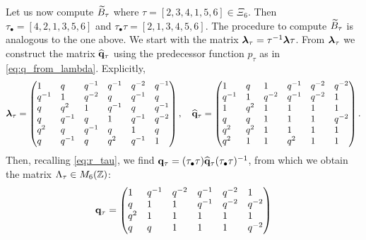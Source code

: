 \begin{example}
	Let us now compute $\widetilde{B}_{\tau}$ where $\tau = [2,3,4,1,5,6] \in \Xi_6$. Then
	$\tau_{\bullet} = [4, 2, 1, 3, 5, 6]$ and $\tau_\bullet\tau = [2, 1, 3, 4, 5, 6]$. The
	procedure to compute $\widetilde{B}_{\tau}$ is analogous to the one above. We start with the
	matrix $\boldsymbol{\lambda}_\tau = \tau^{-1} \boldsymbol{\lambda} \tau$. From $\boldsymbol{\lambda}_\tau$ we construct the matrix
	$\widehat{\mathbf{q}}_\tau$ using the predecessor function $p_\tau$ as in \cref{eq:q_from_lambda}.
	Explicitly,
	\begin{equation}\label{eq:heisenberg_q_hat_tau}
		\bbl_\tau = \begin{pmatrix*}[l]
			1     & q     & q\inv  & q\inv & q^{-2} & q\inv  \\
			q\inv & 1     & q^{-2} & q     & q\inv  & q      \\
			q     & q^{2} & 1      & q\inv & q      & q\inv  \\
			q     & q\inv & q      & 1     & q\inv  & q^{-2} \\
			q^{2} & q     & q\inv  & q     & 1      & q      \\
			q     & q\inv & q      & q^{2} & q\inv  & 1
		\end{pmatrix*}
		, \quad
		\wh{\bbq}_\tau = \begin{pmatrix*}[l]
			1     & q     & 1      & q\inv & q^{-2} & q^{-2} \\
			q\inv & 1     & q^{-2} & q\inv & q^{-2} & 1      \\
			1     & q^{2} & 1      & 1     & 1      & 1      \\
			q     & q     & 1      & 1     & 1      & q^{-2} \\
			q^{2} & q^{2} & 1      & 1     & 1      & 1      \\
			q^{2} & 1     & 1      & q^{2} & 1      & 1
		\end{pmatrix*}.
	\end{equation}
	Then, recalling \cref{eq:r_tau}, we find $\mathbf{q}_\tau = (\tau_\bullet \tau)
		\widehat{\mathbf{q}}_\tau (\tau_\bullet \tau)^{-1}$, from which we obtain the matrix $\Lambda_\tau
		\in M_6(\mathbb{Z})$:
	\begin{equation}\label{eq:heisenberg_q_tau}
		\bbq_\tau = \begin{pmatrix*}[l]
			1     & {q^{-1}} & {q^{-2}} & {q^{-1}} & {q^{-2}} & 1        \\
			q     & 1        & 1        & {q^{-1}} & {q^{-2}} & {q^{-2}} \\
			q^{2} & 1        & 1        & 1        & 1        & 1        \\
			q     & q        & 1        & 1        & 1        & {q^{-2}} \\

\end{pmatrix*}
\end{equation}
\end{example}
